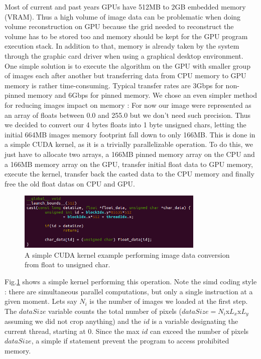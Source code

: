 \documentclass[12pt,journal,compsoc]{IEEEtran}
\begin{document}
Most of current and past years GPUs have 512MB to 2GB embedded memory (VRAM). Thus a high volume of image data can be problematic when doing volume reconstruction on GPU because the grid needed to reconstruct the volume has to be stored too and memory should be kept for the GPU program execution stack. In addition to that, memory is already taken by the system through the graphic card driver when using a graphical desktop environment. 
One simple solution is to execute the algorithm on the GPU with smaller group of images each after another but transferring data from CPU memory to GPU memory is rather time-consuming. 
Typical transfer rates are 3Gbps for non-pinned memory and 6Gbps for pinned memory.
We chose an even simpler method for reducing images impact on memory : For now our image were represented as an array of floats between 0.0 and 255.0 but we don't need such precision. Thus we decided to convert our 4 bytes floats into 1 byte unsigned chars, letting the initial 664MB images memory footprint fall down to only 166MB. This is done in a simple CUDA kernel, as it is a trivially parallelizable operation. To do this, we just have to allocate two arrays, a 166MB pinned memory array on the CPU and a 166MB memory array on the GPU, transfer initial float data to GPU memory, execute the kernel, transfer back the casted data to the CPU memory and finally free the old float datas on CPU and GPU. 

\begin{figure}[!h]
\centering
\includegraphics[width=3.5in]{simple_kernel}
\caption{A simple CUDA kernel example performing image data conversion from float to unsigned char.}
\label{kernel}
\end{figure}

Fig.\ref{kernel} shows a simple kernel performing this operation. Note the \ac{simd} coding style : there are simultaneous parallel computations, but only a single instruction at a given moment. Lets say $N_i$ is the number of images we loaded at the first step. 
The $dataSize$ variable counts the total number of pixels ($dataSize=N_i$x$L_x$x$L_y$ assuming we did not crop anything) and the $id$ is a variable designating the current thread, starting at 0. Since the max $id$ can exceed the number of pixels $dataSize$, a simple if statement prevent the program to access prohibited memory. 
\end{document}

